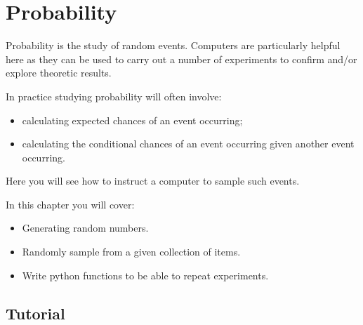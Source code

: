\chapter{Probability}
\label{\detokenize{tools-for-mathematics/06-probability/introduction/main:probability}}\label{\detokenize{tools-for-mathematics/06-probability/introduction/main:id1}}\label{\detokenize{tools-for-mathematics/06-probability/introduction/main::doc}}

Probability is the study of random events. Computers are particularly helpful
here as they can be used to carry out a number of experiments to confirm and/or
explore theoretic results.


In practice studying probability will often involve:
\begin{itemize}
\item 

calculating expected chances of an event occurring;

\item 

calculating the conditional chances of an event occurring given another event
occurring.

\end{itemize}


Here you will see how to instruct a computer to sample such events.



\begin{note}
In this chapter you will cover:
\begin{itemize}
\item 

Generating random numbers.

\item 

Randomly sample from a given collection of items.

\item 

Write python functions to be able to repeat experiments.

\end{itemize}
\end{note}




\section{Tutorial}
\label{\detokenize{tools-for-mathematics/06-probability/tutorial/main:tutorial}}\label{\detokenize{tools-for-mathematics/06-probability/tutorial/main::doc}}


